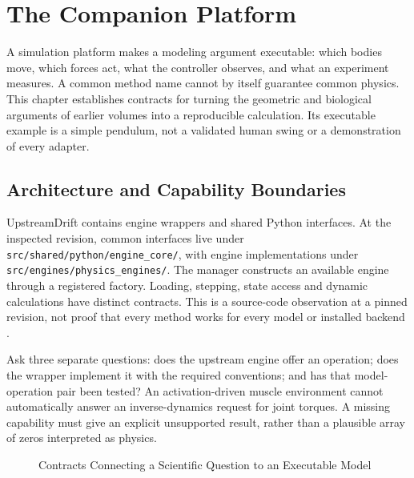 \chapter{The Companion Platform}
\label{ch:platform}

A simulation platform makes a modeling argument executable: which bodies move,
which forces act, what the controller observes, and what an experiment measures.
A common method name cannot by itself guarantee common physics. This chapter
establishes contracts for turning the geometric and biological arguments of
earlier volumes into a reproducible calculation. Its executable example is a
simple pendulum, not a validated human swing or a demonstration of every adapter.

\section{Architecture and Capability Boundaries}

UpstreamDrift contains engine wrappers and shared Python interfaces. At the
inspected revision, common interfaces live under
\texttt{src/shared/python/engine\_core/}, with engine implementations under
\texttt{src/engines/physics\_engines/}. The manager constructs an available
engine through a registered factory. Loading, stepping, state access and dynamic
calculations have distinct contracts. This is a source-code observation at a
pinned revision, not proof that every method works for every model or installed
backend \cite{UpstreamPlatformReview}.

Ask three separate questions: does the upstream engine offer an operation;
does the wrapper implement it with the required conventions; and has that
model-operation pair been tested? An activation-driven muscle environment cannot
automatically answer an inverse-dynamics request for joint torques. A missing
capability must give an explicit unsupported result, rather than a plausible
array of zeros interpreted as physics.

\begin{figure}[ht]
\centering
{}
\caption{Contracts Connecting a Scientific Question to an Executable Model}
\label{fig:platform-arch}
\end{figure}

